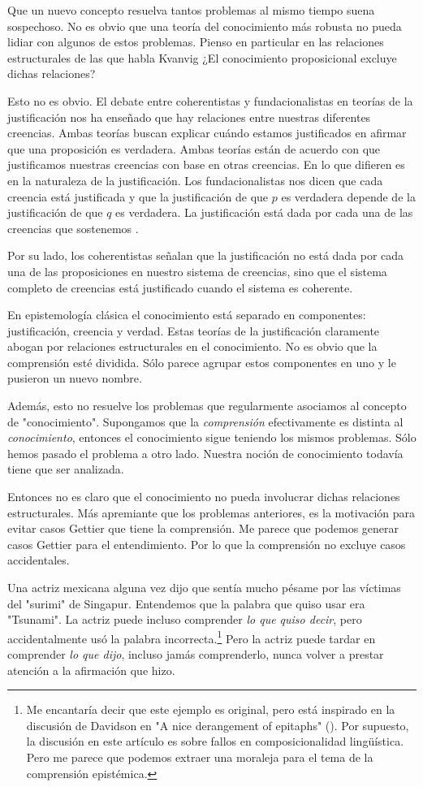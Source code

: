 Que un nuevo concepto resuelva tantos problemas al mismo tiempo suena sospechoso. 
No es obvio que una teoría del conocimiento más robusta no pueda lidiar con algunos de estos problemas.
Pienso en particular en las relaciones estructurales de las que habla Kvanvig ¿El conocimiento proposicional excluye dichas relaciones?

Esto no es obvio. El debate entre coherentistas y fundacionalistas en teorías de la justificación nos ha enseñado que hay relaciones entre nuestras diferentes creencias.
Ambas teorías buscan explicar cuándo estamos justificados en afirmar que una proposición es verdadera.
Ambas teorías están de acuerdo con que justificamos nuestras creencias con base en otras creencias.
En lo que difieren es en la naturaleza de la justificación.
Los fundacionalistas nos dicen que cada creencia está justificada y que la justificación de que $p$ es verdadera depende de la justificación de que $q$ es verdadera.
La justificación está dada por cada una de las creencias que sostenemos .

Por su lado, los coherentistas señalan que la justificación no está dada por cada una de las proposiciones en nuestro sistema de creencias, sino que el sistema completo de creencias está justificado cuando el sistema es coherente. %

En epistemología clásica el conocimiento está separado en componentes: justificación, creencia y verdad.
Estas teorías de la justificación claramente abogan por relaciones estructurales en el conocimiento.
No es obvio que la comprensión esté dividida. Sólo parece agrupar estos componentes en uno y le pusieron un nuevo nombre.

Además, esto no resuelve los problemas que regularmente asociamos al concepto de "conocimiento".
Supongamos que la \emph{comprensión} efectivamente es distinta al \emph{conocimiento}, entonces el conocimiento sigue teniendo los mismos problemas.
Sólo hemos pasado el problema a otro lado.
Nuestra noción de conocimiento todavía tiene que ser analizada.

Entonces no es claro que el conocimiento no pueda involucrar dichas relaciones estructurales.
Más apremiante que los problemas anteriores, es la motivación para evitar casos Gettier que tiene la comprensión.
Me parece que podemos generar casos Gettier para el entendimiento.
Por lo que la comprensión no excluye casos accidentales.

Una actriz mexicana alguna vez dijo que sentía mucho pésame por las víctimas del "surimi" de Singapur.
Entendemos que la palabra que quiso usar era "Tsunami".
La actriz puede incluso comprender \emph{lo que quiso decir}, pero accidentalmente usó la palabra incorrecta.\footnote{Me encantaría decir que este ejemplo es original, pero está inspirado en la discusión de Davidson en "A nice derangement of epitaphs" (\citeyear{davidson1986}). Por supuesto, la discusión en este artículo es sobre fallos en composicionalidad lingüística. Pero me parece que podemos extraer una moraleja para el tema de la comprensión epistémica.}
Pero la actriz puede tardar en comprender \emph{lo que dijo}, incluso jamás comprenderlo, nunca volver a prestar atención a la afirmación que hizo.

